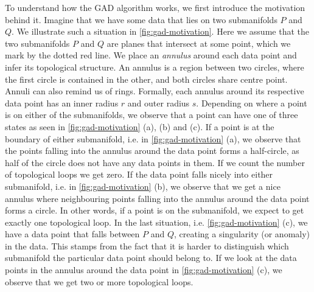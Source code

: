 To understand how the GAD algorithm works, we first introduce the motivation behind it. Imagine that we have some data that lies on two submanifolds $P$ and $Q$. We illustrate such a situation in \cref{fig:gad-motivation}. Here we assume that the two submanifolds $P$ and $Q$ are planes that intersect at some point, which we mark by the dotted red line. We place an \textit{annulus} around each data point and infer its topological structure. An annulus is a region between two circles, where the first circle is contained in the other, and both circles share centre point. Annuli can also remind us of rings. Formally, each annulus around its respective data point has an inner radius $r$ and outer radius $s$. Depending on where a point is on either of the submanifolds, we observe that a point can have one of three states as seen in \cref{fig:gad-motivation} (a), (b) and (c). If a point is at the boundary of either submanifold, i.e. in \cref{fig:gad-motivation} (a), we observe that the points falling into the annulus around the data point forms a half-circle, as half of the circle does not have any data points in them. If we count the number of topological loops we get zero. If the data point falls nicely into either submanifold, i.e. in \cref{fig:gad-motivation} (b), we observe that we get a nice annulus where neighbouring points falling into the annulus around the data point forms a circle. In other words, if a point is on the submanifold, we expect to get exactly one topological loop. In the last situation, i.e. \cref{fig:gad-motivation} (c), we have a data point that falls between $P$ and $Q$, creating a singularity (or anomaly) in the data. This stamps from the fact that it is harder to distinguish which submanifold the particular data point should belong to. If we look at the data points in the annulus around the data point in \cref{fig:gad-motivation} (c), we observe that we get two or more topological loops.
